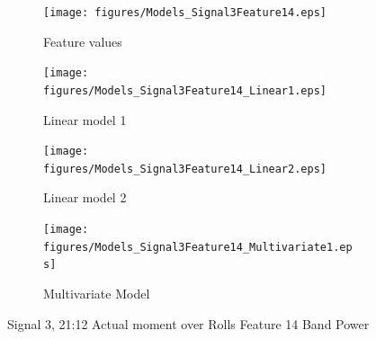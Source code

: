 \documentclass[]{article}
\begin{document}
\begin{figure}[H]
	\captionsetup[subfigure]{justification=Centering}
    \centering
		\begin{subfigure}{.45\textwidth}
		  \centering
    			\texttt{[image: figures/Models\_Signal3Feature14.eps]}
		  	\caption{Feature values}
		  	\label{fig:Models_Signal3Feature14}
		\end{subfigure}\hspace{\fill} %
		\begin{subfigure}{.45\textwidth}
		  \centering
 		   	\texttt{[image: figures/Models\_Signal3Feature14\_Linear1.eps]}
		  	\caption{Linear model 1}
		  	\label{fig:Models_Signal3Feature14_Linear1}
		\end{subfigure}
		\bigskip
		\begin{subfigure}{.45\textwidth}
		  \centering
    			\texttt{[image: figures/Models\_Signal3Feature14\_Linear2.eps]}
		  	\caption{Linear model 2}
		  	\label{fig:Models_Signal3Feature14_Linear2}
		\end{subfigure}\hspace{\fill} %
		\begin{subfigure}{.45\textwidth}
		  \centering
 		   	\texttt{[image: figures/Models\_Signal3Feature14\_Multivariate1.eps]}
		  	\caption{Multivariate Model}
		  	\label{fig:Models_Signal3Feature14_Multivariate1}
		\end{subfigure}
    \caption{Signal 3, 21:12 Actual moment over Rolls Feature 14 Band Power}
    \label{fig:Models_Signal3Feature14_Caption}
\end{figure}



\end{document}
